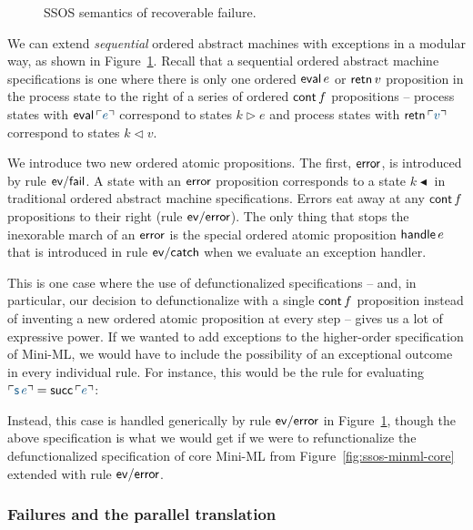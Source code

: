 \begin{figure}
\caption{SSOS semantics of recoverable failure.}
\label{fig:ssos-fail}
\end{figure}


We can extend {\it sequential} ordered abstract machines with
exceptions in a modular way, as shown in
Figure~\ref{fig:ssos-fail}. Recall that a sequential ordered abstract
machine specifications is one where there is only one ordered ${\sf
  eval}\,e$ or ${\sf retn}\,v$ proposition in the process state to the
right of a series of ordered ${\sf cont}\,f$ propositions -- process
states with ${\sf eval}\,\interp{e}$ correspond to states $k \rhd e$
and process states with ${\sf retn}\,\interp{v}$ correspond to states
$k \lhd v$. 

We introduce two new ordered atomic propositions. The first, ${\sf
  error}$, is introduced by rule ${\sf ev/fail}$.
 A state with an ${\sf error}$
proposition corresponds to a state $k{\blacktriangleleft}$ in
traditional ordered abstract machine specifications. Errors eat away
at any ${\sf cont}\,f$ propositions to their right (rule ${\sf
  ev/error}$). The only thing that stops the inexorable march of an
${\sf error}$ is the special ordered atomic proposition ${\sf
  handle}\,e$ that is introduced in rule ${\sf ev/catch}$ when we
evaluate an exception handler.

This is one case where the use of defunctionalized specifications --
and, in particular, our decision to defunctionalize with a single
${\sf cont}\,f$ proposition instead of inventing a new ordered atomic
proposition at every step -- gives us a lot of expressive power. If we
wanted to add exceptions to the higher-order specification of Mini-ML,
we would have to include the possibility of an exceptional outcome in
every individual rule. For instance, this would be the 
rule for evaluating $\interp{{\sf s}\,e} = {\sf succ}\,\interp{e}$:


\noindent
Instead, this case is handled generically by rule ${\sf ev/error}$ in
Figure~\ref{fig:ssos-fail}, though the above specification is what we
would get if we were to refunctionalize the defunctionalized
specification of core Mini-ML from Figure~\ref{fig:ssos-minml-core}
extended with rule ${\sf ev/error}$.

\subsubsection{Failures and the parallel translation}

